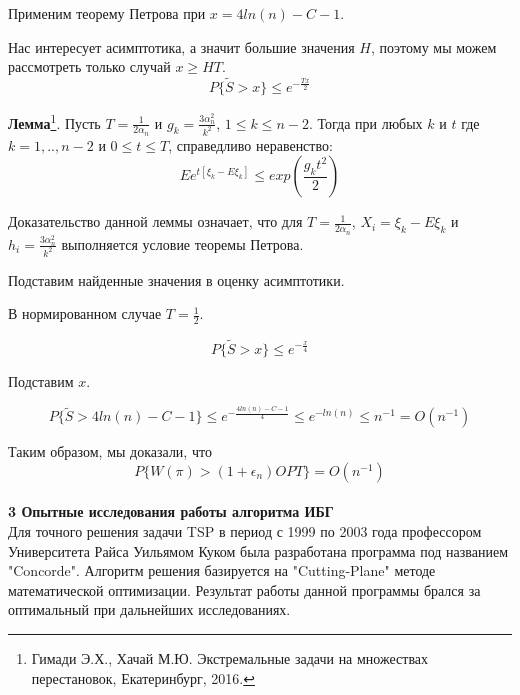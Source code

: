 \documentclass[a4paper, 14pt]{extarticle}
\begin{document}
Применим теорему Петрова при $x = 4ln(n) - C - 1 $.

Нас интересует асимптотика, а значит большие значения $H$, поэтому мы можем рассмотреть только случай $x \geq HT$.
\begin{equation}
P\{\tilde{S} >x \} \leq e^{-\frac{Tx}{2}}
\end{equation}

\textbf{Лемма}\footnote{ Гимади Э.Х., Хачай М.Ю. Экстремальные задачи на множествах перестановок, Екатеринбург, 2016.}. Пусть $T = \frac{1}{2\alpha_n}$ и $g_k = \frac{3\alpha_n^2}{k^2}$, $1 \leq k \leq n-2$. Тогда при любых $k$ и $t$ где $k=1,..,n-2$ и $0 \leq t \leq T$, справедливо неравенство:
\begin{equation}
Ee^{t[\xi_k-E\xi_k]} \leq exp(\frac{g_k t^2}{2})
\end{equation}


Доказательство данной леммы означает, что для $T = \frac{1}{2\alpha_n}$, $X_i = \xi_k-E\xi_k$ и $h_i = \frac{3\alpha_n^2}{k^2}$ выполняется условие теоремы Петрова.

Подставим найденные значения в оценку асимптотики.

В нормированном случае $T = \frac{1}{2}$.

\begin{equation}
P\{\tilde{S} >x \} \leq e^{-\frac{x}{4}}
\end{equation}

Подставим $x$.

\begin{equation}
P\{\tilde{S} >4ln(n) - C - 1 \} \leq e^{-\frac{4ln(n) - C - 1}{4}} \leq e^{-ln(n)} \leq n^{-1} = O(n^{-1})
\end{equation}

Таким образом, мы доказали, что
\begin{equation}
P\{ W(\pi)>(1+\epsilon_n)OPT \} = O(n^{-1})
\end{equation}\\



\textbf{3 Опытные исследования работы алгоритма ИБГ}\\


Для точного решения задачи TSP в период с 1999 по 2003 года профессором Университета Райса Уильямом Куком была разработана программа под названием "Concorde". Алгоритм решения базируется на "Cutting-Plane" методе математической оптимизации. Результат работы данной программы брался за оптимальный при дальнейших исследованиях.
\end{document}
